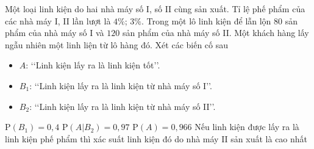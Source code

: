 \begin{ex}%
	Một loại linh kiện do hai nhà máy số I, số II cùng sản xuất. Tỉ lệ phế phẩm của các nhà máy I, II lần lượt là $4\%$; $3\%$. Trong một lô linh kiện để lẫn lộn $80$ sản phẩm của nhà máy số I và $120$ sản phẩm của nhà máy số II. Một khách hàng lấy ngẫu nhiên một linh liện từ lô hàng đó. Xét các biến cố sau
	\begin{itemize}
	\item $A$: \lq\lq  Linh kiện lấy ra là linh kiện tốt\rq\rq.
	\item $B_1$: \lq\lq  Linh kiện lấy ra là linh kiện từ nhà máy số I\rq\rq.
	\item $B_2$: \lq\lq  Linh kiện lấy ra là linh kiện từ nhà máy số II\rq\rq.
	\end{itemize}
	\choiceTF
	{\True $\mathrm{P}(B_1)=0{,}4$}
	{\True $\mathrm{P}\left(A|B_2\right) = 0{,}97$}
	{\True $\mathrm{P}(A) = 0{,}966$}
	{Nếu linh kiện được lấy ra là linh kiện phế phẩm thì xác suất linh kiện đó do nhà máy II sản xuất là cao nhất}
\end{ex}

